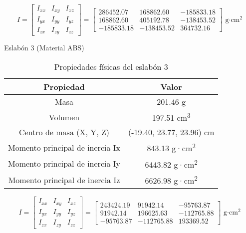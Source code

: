 \begin{equation*}
	I =
	\begin{bmatrix}
		I_{xx} & I_{xy} & I_{xz} \\
		I_{yx} & I_{yy} & I_{yz} \\
		I_{zx} & I_{zy} & I_{zz}
	\end{bmatrix}
	=
	\begin{bmatrix}
		286452.07 & 168862.60 & -185833.18 \\
		168862.60 & 405192.78 & -138453.52 \\
		-185833.18 & -138453.52 & 364732.16
	\end{bmatrix}
	\text{ g·cm}^2
\end{equation*}

{Eslabón 3 (Material ABS)}



\begin{table}[H]
	\centering
	\caption{Propiedades físicas del eslabón 3}
	\begin{tabular}{|c|c|}
		\hline
		\textbf{Propiedad} & \textbf{Valor} \\
		\hline
		Masa & 201.46 g \\
		Volumen & 197.51 cm\textsuperscript{3} \\
		Centro de masa (X, Y, Z) & (-19.40, 23.77, 23.96) cm \\
		Momento principal de inercia Ix & 843.13 g·cm\textsuperscript{2} \\
		Momento principal de inercia Iy & 6443.82 g·cm\textsuperscript{2} \\
		Momento principal de inercia Iz & 6626.98 g·cm\textsuperscript{2} \\
		\hline
	\end{tabular}
\end{table}


\begin{equation*}
	I =
	\begin{bmatrix}
		I_{xx} & I_{xy} & I_{xz} \\
		I_{yx} & I_{yy} & I_{yz} \\
		I_{zx} & I_{zy} & I_{zz}
	\end{bmatrix}
	=
	\begin{bmatrix}
		243424.19 & 91942.14 & -95763.87 \\
		91942.14 & 196625.63 & -112765.88 \\
		-95763.87 & -112765.88 & 193369.52
	\end{bmatrix}
	\text{ g·cm}^2
\end{equation*}

